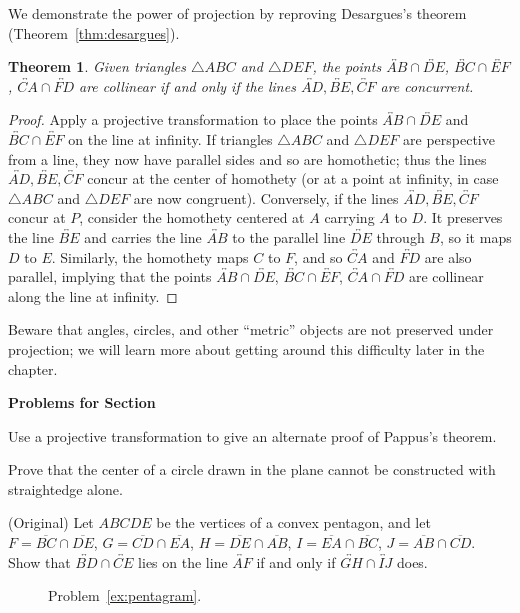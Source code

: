 \documentclass[12pt]{book}
\newcounter{exc}
\numberwithin{exc}{section}
\numberwithin{figure}{section}
\newenvironment{exer}{\vspace{0.1in}
\noindent \textbf{Problems for Section~\thesection} \vspace{0.1in}
\begin{list}{\arabic{exc}.}{\usecounter{exc}}}{\end{list}}
\newtheorem{theorem}{Theorem}[section]
\numberwithin{equation}{theorem}
\def\ii{\item}
\def\line#1{\overleftrightarrow{#1}}
\def\seg#1{\overline{#1}}
\begin{document}
We demonstrate the power of projection by reproving
Desargues's theorem (Theorem~\ref{thm:desargues}).
 
\begin{theorem}
Given triangles $\triangle ABC$ and $\triangle DEF$,
the points $\line{AB} \cap \line{DE}$, 
$\line{BC} \cap \line{EF}$, $\line{CA} \cap \line{FD}$ are 
collinear if and only if the lines $\line{AD}, \line{BE}, \line{CF}$ 
are concurrent.
\end{theorem}
\begin{proof}
Apply a projective transformation to place the 
points $\line{AB} \cap \line{DE}$ and $\line{BC} \cap \line{EF}$ 
on the line at infinity. 
If triangles $\triangle ABC$ and $\triangle DEF$ are perspective from 
a line, they now have parallel sides and so are homothetic; thus
the lines $\line{AD}, \line{BE}, \line{CF}$ concur 
at the center of homothety (or at a point at infinity, in case $\triangle 
ABC$  and $\triangle DEF$ are now 
congruent). Conversely, if the lines $\line{AD}, \line{BE}, \line{CF}$ 
concur 
at $P$, consider the homothety centered at $A$ carrying $A$ to $D$. It 
preserves the line $\line{BE}$ and carries the line $\line{AB}$ 
to the parallel 
line $\line{DE}$ through $B$, so it maps $D$ to $E$. Similarly, the 
homothety maps $C$ to $F$, and so $\line{CA}$ and $\line{FD}$ 
are also parallel, 
implying that the points $\line{AB} \cap \line{DE}$, 
$\line{BC} \cap \line{EF}$, $\line{CA} \cap \line{FD}$
are collinear along the line at infinity.
\end{proof}

Beware that angles, circles, and other ``metric'' objects are not
preserved under projection; we will learn more about getting around
this difficulty later in the chapter.

\begin{exer}
\ii
Use a projective transformation to give an alternate proof of Pappus's 
theorem.
\ii \label{ex:cencirc}
Prove that the center of a circle drawn in the plane cannot be
constructed with straightedge alone.
\ii \label{ex:pentagram}
(Original)
Let $ABCDE$ be the vertices of a convex
pentagon, and let $F = \seg{BC} \cap \seg{DE}$, 
$G = \seg{CD} \cap \seg{EA}$, $H = \seg{DE} \cap \seg{AB}$,
$I = \seg{EA} \cap \seg{BC}$, $J = \seg{AB} \cap \seg{CD}$. 
Show that $\line{BD} 
\cap \line{CE}$ lies on the line $\line{AF}$ if and only if $\line{GH} \cap 
\line{IJ}$ does. 
\begin{figure}[ht]
\caption{Problem~\ref{ex:pentagram}.}
\end{figure}
\end{exer}
\end{document}
